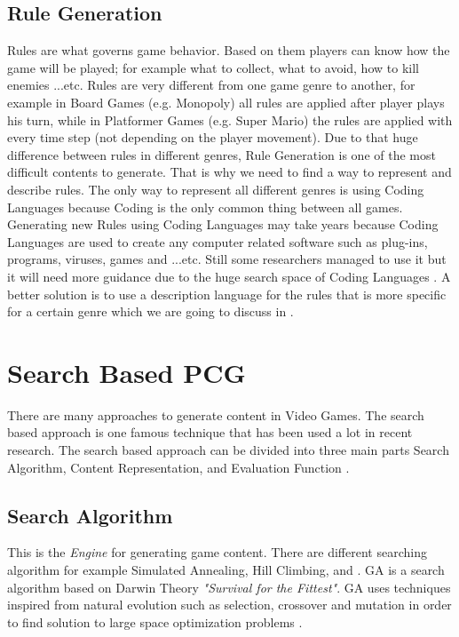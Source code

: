 \subsection{Rule Generation}
Rules are what governs game behavior. Based on them players can know how the game will be played; for example what to collect, what to avoid, how to kill enemies ...etc. Rules are very different from one game genre to another, for example in Board Games (e.g. Monopoly) all rules are applied after player plays his turn, while in Platformer Games (e.g. Super Mario) the rules are applied with every time step (not depending on the player movement). Due to that huge difference between rules in different genres, Rule Generation is one of the most difficult contents to generate. That is why we need to find a way to represent and describe rules. The only way to represent all different genres is using Coding Languages because Coding is the only common thing between all games. Generating new Rules using Coding Languages may take years because Coding Languages are used to create any computer related software such as plug-ins, programs, viruses, games and ...etc. Still some researchers managed to use it but it will need more guidance due to the huge search space of Coding Languages \cite{mechanicMiner}. A better solution is to use a description language for the rules that is more specific for a certain genre which we are going to discuss in  \cite{pcgBookRules}.
 
\section{Search Based PCG}
There are many approaches to generate content in Video Games. The search based approach is one famous technique that has been used a lot in recent research. The search based approach can be divided into three main parts Search Algorithm, Content Representation, and Evaluation Function \cite{pcgBookSearch}.
\subsection{Search Algorithm}
This is the \emph{Engine} for generating game content. There are different searching algorithm for example Simulated Annealing, Hill Climbing, and . GA is a search algorithm based on Darwin Theory \textit{"Survival for the Fittest"}. GA uses techniques inspired from natural evolution such as selection, crossover and mutation in order to find solution to large space optimization problems \cite{geneticAlgorithm}.

